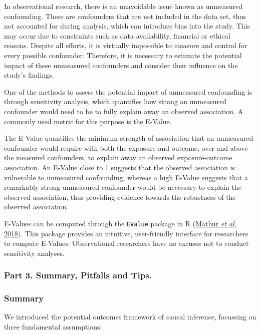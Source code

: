 \documentclass[
  singlecolumn]{article}
\begin{document}
In observational research, there is an unavoidable issue known as
unmeasured confounding. These are confounders that are not included in
the data set, thus not accounted for during analysis, which can
introduce bias into the study. This may occur due to constraints such as
data availability, financial or ethical reasons. Despite all efforts, it
is virtually impossible to measure and control for every possible
confounder. Therefore, it is necessary to estimate the potential impact
of these unmeasured confounders and consider their influence on the
study's findings.

One of the methods to assess the potential impact of unmeasured
confounding is through sensitivity analysis, which quantifies how strong
an unmeasured confounder would need to be to fully explain away an
observed association. A commonly used metric for this purpose is the
E-Value.

The E-Value quantifies the minimum strength of association that an
unmeasured confounder would require with both the exposure and outcome,
over and above the measured confounders, to explain away an observed
exposure-outcome association. An E-Value close to 1 suggests that the
observed association is vulnerable to unmeasured confounding, whereas a
high E-Value suggests that a remarkably strong unmeasured confounder
would be necessary to explain the observed association, thus providing
evidence towards the robustness of the observed association.

E-Values can be computed through the \texttt{EValue} package in R
(\protect\hyperlink{ref-mathur2018}{Mathur \emph{et al.} 2018}). This
package provides an intuitive, user-friendly interface for researchers
to compute E-Values. Observational researchers have no excuses not to
conduct sensitivity analyses.

\hypertarget{part-3.-summary-pitfalls-and-tips.}{%
\subsubsection{Part 3. Summary, Pitfalls and
Tips.}\label{part-3.-summary-pitfalls-and-tips.}}

\hypertarget{summary}{%
\subsubsection{Summary}\label{summary}}

We introduced the potential outcomes framework of causal inference,
focussing on three fundamental assumptions:
\end{document}
